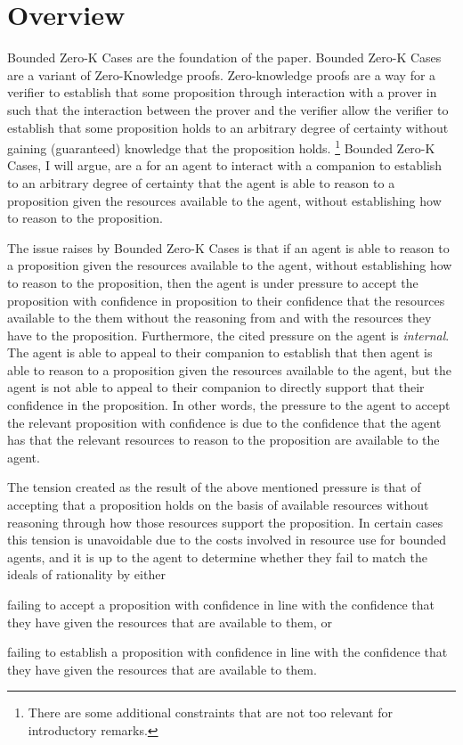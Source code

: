 \documentclass[10pt]{article}
\begin{document}
\newpage



\section{Overview}
\label{sec:overview}

Bounded Zero-K Cases are the foundation of the paper.
Bounded Zero-K Cases are a variant of Zero-Knowledge proofs.
Zero-knowledge proofs are a way for a verifier to establish that some proposition through interaction with a prover in such that the interaction between the prover and the verifier allow the verifier to establish that some proposition holds to an arbitrary degree of certainty without gaining (guaranteed) knowledge that the proposition holds.\nolinebreak
\footnote{There are some additional constraints that are not too relevant for introductory remarks.}
Bounded Zero-K Cases, I will argue, are a for an agent to interact with a companion to establish to an arbitrary degree of certainty that the agent is able to reason to a proposition given the resources available to the agent, without establishing how to reason to the proposition.

The issue raises by Bounded Zero-K Cases is that if an agent is able to reason to a proposition given the resources available to the agent, without establishing how to reason to the proposition, then the agent is under pressure to accept the proposition with confidence in proposition to their confidence that the resources available to the them without the reasoning from and with the resources they have to the proposition.
Furthermore, the cited pressure on the agent is \emph{internal}.
The agent is able to appeal to their companion to establish that then agent is able to reason to a proposition given the resources available to the agent, but the agent is not able to appeal to their companion to directly support that their confidence in the proposition.
In other words, the pressure to the agent to accept the relevant proposition with confidence is due to the confidence that the agent has that the relevant resources to reason to the proposition are available to the agent.

The tension created as the result of the above mentioned pressure is that of accepting that a proposition holds on the basis of available resources without reasoning through how those resources support the proposition.
In certain cases this tension is unavoidable due to the costs involved in resource use for bounded agents, and it is up to the agent to determine whether they fail to match the ideals of rationality by either
\begin{enumerate*}[label=(\alph*)]
\item failing to accept a proposition with confidence in line with the confidence that they have given the resources that are available to them, or
\item failing to establish a proposition with confidence in line with the confidence that they have given the resources that are available to them.
\end{enumerate*}
\end{document}
